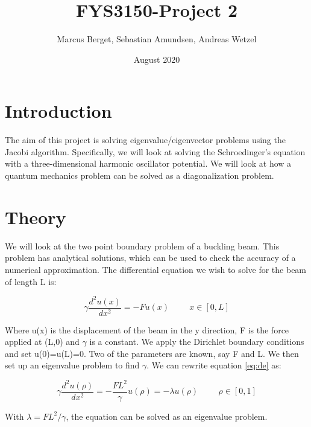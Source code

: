 \documentclass[norsk,a4paper,12pt]{article}
\begin{document}
\title{FYS3150-Project 2}
\author{Marcus Berget, Sebastian Amundsen, Andreas Wetzel}
\date{August 2020}
\maketitle

\begin{abstract}

\end{abstract}

\section{Introduction}

The aim of this project is solving eigenvalue/eigenvector problems using the Jacobi algorithm. Specifically, we will look at solving the Schroedinger's equation with a three-dimensional harmonic oscillator potential. We will look at how a quantum mechanics problem can be solved as a diagonalization problem. 

\section{Theory}

We will look at the two point boundary problem of a buckling beam. This problem has analytical solutions, which can be used to check the accuracy of a numerical approximation. The differential equation we wish to solve for the beam of length L is:

\begin{equation}
\gamma \frac{d^2 u(x)}{dx^2}=-Fu(x)  \hspace{1cm}  x \in [0,L]
 \label{eq:de}
 \end{equation}

Where u(x) is the displacement of the beam in the y direction, F is the force applied at (L,0) and $\gamma$ is a constant. We apply the Dirichlet boundary conditions and set u(0)=u(L)=0. Two of the parameters are known, say F and L. We then set up an eigenvalue problem to find $\gamma$. We can rewrite equation \ref{eq:de} as:

\begin{equation}
\gamma \frac{d^2 u(\rho)}{dx^2}=-\frac{FL^2}{\gamma}u(\rho)=-\lambda u(\rho)  \hspace{1cm}  \rho \in [0,1]
 \label{eq:de2}
 \end{equation}

With $\lambda=FL^2/\gamma$, the equation can be solved as an eigenvalue problem.
\end{document}
